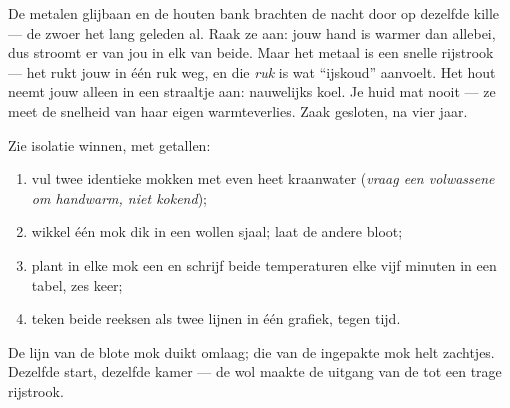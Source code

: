 \begin{example}\label{ex:g5:heat-and-insulation:slide}
De metalen glijbaan en de houten bank brachten de nacht door op
dezelfde kille  --- de  zwoer het lang geleden
al. Raak ze aan: jouw hand is warmer dan allebei, dus stroomt er
 van jou in elk van beide. Maar het metaal is een snelle
rijstrook --- het rukt jouw  in één ruk weg, en die \emph{ruk} is
wat ``ijskoud'' aanvoelt. Het hout neemt jouw  alleen in een
straaltje aan: nauwelijks koel. Je huid mat nooit  --- ze
meet de snelheid van haar eigen warmteverlies. Zaak gesloten, na vier
jaar.
\end{example}

\begin{method}[De afkoelrace]\label{met:g5:heat-and-insulation:race}
Zie isolatie winnen, met getallen:
\begin{enumerate}
  \item vul twee identieke mokken met even heet kraanwater
        (\emph{vraag een volwassene om handwarm, niet kokend});
  \item wikkel één mok dik in een wollen sjaal; laat de andere bloot;
  \item plant in elke mok een  en schrijf beide
        temperaturen elke vijf minuten in een tabel, zes keer;
  \item teken beide reeksen als twee lijnen in één grafiek,
         tegen tijd.
\end{enumerate}
De lijn van de blote mok duikt omlaag; die van de ingepakte mok
helt zachtjes. Dezelfde start, dezelfde kamer --- de wol maakte de
uitgang van de  tot een trage rijstrook.
\end{method}

